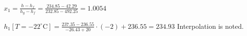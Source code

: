 \( x_1 = \frac{h - h_f}{h_g - h_f} = \frac{234.85 - 42.29}{232.85 - 492.25} = 1.0054 \)

\( h_1 [T = -22^\circ \text{C}] = \frac{237.35 - 236.55}{-26.43 + 20} \cdot (-2) + 236.55 = 234.93 \)  
Interpolation is noted.